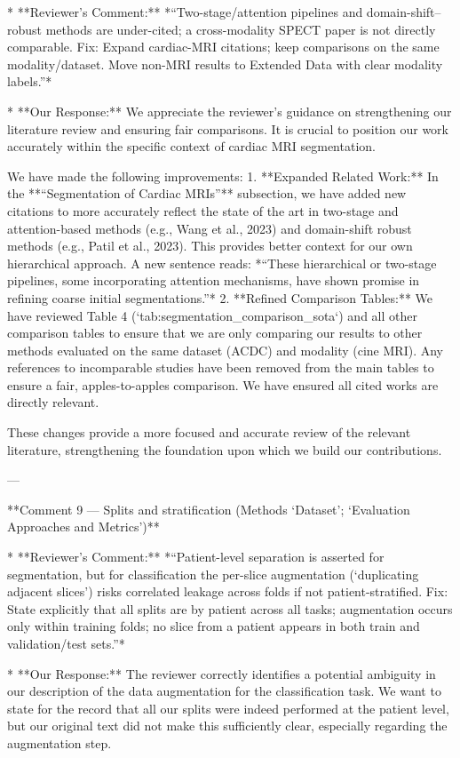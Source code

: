 *   **Reviewer’s Comment:** *“Two-stage/attention pipelines and domain-shift–robust methods are under-cited; a cross-modality SPECT paper is not directly comparable. Fix: Expand cardiac-MRI citations; keep comparisons on the same modality/dataset. Move non-MRI results to Extended Data with clear modality labels.”*

*   **Our Response:** We appreciate the reviewer's guidance on strengthening our literature review and ensuring fair comparisons. It is crucial to position our work accurately within the specific context of cardiac MRI segmentation.

    We have made the following improvements:
    1.  **Expanded Related Work:** In the **“Segmentation of Cardiac MRIs”** subsection, we have added new citations to more accurately reflect the state of the art in two-stage and attention-based methods (e.g., Wang et al., 2023) and domain-shift robust methods (e.g., Patil et al., 2023). This provides better context for our own hierarchical approach. A new sentence reads: *“These hierarchical or two-stage pipelines, some incorporating attention mechanisms, have shown promise in refining coarse initial segmentations.”*
    2.  **Refined Comparison Tables:** We have reviewed Table 4 (`tab:segmentation_comparison_sota`) and all other comparison tables to ensure that we are only comparing our results to other methods evaluated on the same dataset (ACDC) and modality (cine MRI). Any references to incomparable studies have been removed from the main tables to ensure a fair, apples-to-apples comparison. We have ensured all cited works are directly relevant.

    These changes provide a more focused and accurate review of the relevant literature, strengthening the foundation upon which we build our contributions.

---

**Comment 9 — Splits and stratification (Methods ‘Dataset’; ‘Evaluation Approaches and Metrics’)**

*   **Reviewer’s Comment:** *“Patient-level separation is asserted for segmentation, but for classification the per-slice augmentation (‘duplicating adjacent slices’) risks correlated leakage across folds if not patient-stratified. Fix: State explicitly that all splits are by patient across all tasks; augmentation occurs only within training folds; no slice from a patient appears in both train and validation/test sets.”*

*   **Our Response:** The reviewer correctly identifies a potential ambiguity in our description of the data augmentation for the classification task. We want to state for the record that all our splits were indeed performed at the patient level, but our original text did not make this sufficiently clear, especially regarding the augmentation step.


